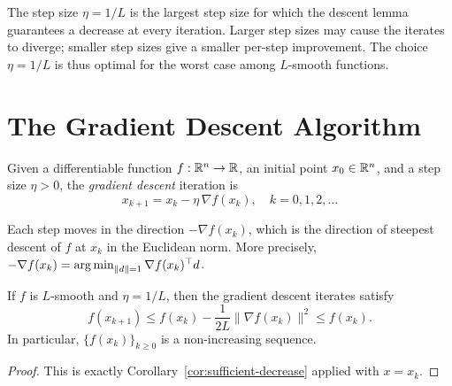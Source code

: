 \documentclass[11pt,a4paper]{article}
\begin{document}
\begin{remark}\label{rem:step-size-choice}
The step size $\eta = 1/L$ is the largest step size for which the descent
lemma guarantees a decrease at every iteration. Larger step sizes may cause
the iterates to diverge; smaller step sizes give a smaller per-step
improvement. The choice $\eta = 1/L$ is thus optimal for the worst case
among $L$-smooth functions.
\end{remark}


\section{The Gradient Descent Algorithm}\label{sec:algorithm}

\begin{definition}\label{def:gd}
Given a differentiable function $f : \mathbb{R}^n \to \mathbb{R}$, an initial point
$x_0 \in \mathbb{R}^n$, and a step size $\eta > 0$, the \emph{gradient descent}
iteration is
\begin{equation}\label{eq:gd}
  x_{k+1} = x_k - \eta\, \nabla f(x_k), \quad k = 0, 1, 2, \dots
\end{equation}
\end{definition}

\begin{remark}\label{rem:steepest}
Each step moves in the direction $-\nabla f(x_k)$, which is the direction
of steepest descent of $f$ at $x_k$ in the Euclidean norm. More precisely,
$-\nabla f(x_k) = \operatorname{arg\,min}_{\|d\| = 1} \nabla f(x_k)^\top d$.
\end{remark}

\begin{proposition}\label{prop:monotone}
If $f$ is $L$-smooth and $\eta = 1/L$, then the gradient descent iterates
satisfy
\begin{equation}\label{eq:monotone}
  f(x_{k+1}) \le f(x_k) - \frac{1}{2L}\|\nabla f(x_k)\|^2 \le f(x_k).
\end{equation}
In particular, $\{f(x_k)\}_{k \ge 0}$ is a non-increasing sequence.
\end{proposition}

\begin{proof}
This is exactly Corollary~\ref{cor:sufficient-decrease} applied with
$x = x_k$.
\end{proof}
\end{document}
